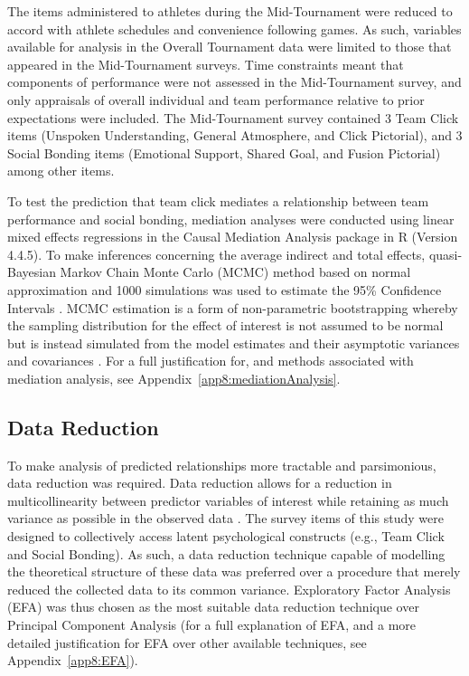\begin{CJK}{UTF8}{gbsn}
The items administered to athletes during the Mid-Tournament were reduced to accord with athlete schedules and convenience following games.  As such, variables available for analysis in the Overall Tournament data were limited to those that appeared in the Mid-Tournament surveys.  Time constraints meant that components of performance were not assessed in the Mid-Tournament survey, and only appraisals of overall individual and team performance relative to prior expectations were included.  The Mid-Tournament survey contained 3 Team Click items (Unspoken Understanding, General Atmosphere, and Click Pictorial), and 3 Social Bonding items (Emotional Support, Shared Goal, and Fusion Pictorial) among other items.

To test the prediction that team click mediates a relationship between team performance and social bonding, mediation analyses were conducted using linear mixed effects regressions in the Causal Mediation Analysis package in R (Version 4.4.5).  To make inferences concerning the average indirect and total effects, quasi-Bayesian Markov Chain Monte Carlo (MCMC) method based on normal approximation and 1000 simulations was used to estimate the 95\% Confidence Intervals \citep{Tofighi2016a,Imai2010}. MCMC estimation is a form of non-parametric bootstrapping whereby the sampling distribution for the effect of interest is not assumed to be normal but is instead simulated from the model estimates and their asymptotic variances and covariances \citep{Preacher2008}.  For a full justification for, and methods associated with mediation analysis, see Appendix~\ref{app8:mediationAnalysis}.

\subsection{Data Reduction\label{Ch5:dataReduction}}
 To make analysis of predicted relationships more tractable and parsimonious, data reduction was required.  Data reduction allows for a reduction in multicollinearity between predictor variables of interest while retaining as much variance as possible in the observed data \citep{Yong2013}.  The survey items of this study were designed to collectively access latent psychological constructs  (e.g., Team Click and Social Bonding).  As such, a data reduction technique capable of modelling the theoretical structure of these data was preferred over a procedure that merely reduced the collected data to its common variance.  Exploratory Factor Analysis (EFA) was thus chosen as the most suitable data reduction technique over Principal Component Analysis (for a full explanation of EFA, and a more detailed justification for EFA over other available techniques, see Appendix~\ref{app8:EFA}).


\end{CJK}
